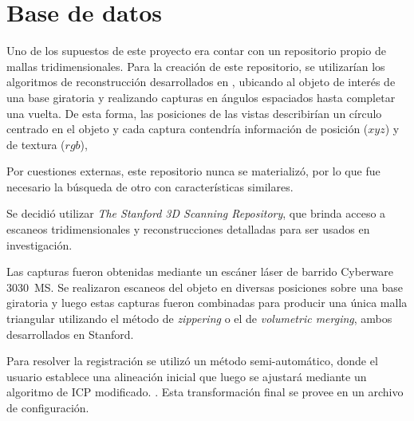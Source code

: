 \section{Base de datos}
Uno de los supuestos de este proyecto era contar con un repositorio propio de
mallas tridimensionales.
Para la creación de este repositorio,
se utilizarían los algoritmos de reconstrucción desarrollados en \cite{Pancho},
ubicando al objeto de interés de una base giratoria y realizando capturas
en ángulos espaciados hasta completar una vuelta.
De esta forma, las posiciones de las vistas describirían un círculo centrado en el objeto y
cada captura contendría información de posición ($xyz$) y de textura ($rgb$),

Por cuestiones externas, este repositorio nunca se materializó, por lo que fue necesario
la búsqueda de otro con características similares.


Se decidió utilizar \emph{The Stanford 3D Scanning Repository}, que brinda
acceso a escaneos tridimensionales y reconstrucciones detalladas para ser
usados en investigación.

Las capturas fueron obtenidas mediante un escáner láser de barrido Cyberware
3030~MS.  Se realizaron escaneos del objeto en diversas posiciones sobre una
base giratoria y luego estas capturas fueron combinadas para producir una única
malla triangular utilizando el método de \emph{zippering} o el de
\emph{volumetric merging}, ambos desarrollados en
Stanford.\cite{StanfordScanRep}

Para resolver la registración se utilizó un método semi-automático,
donde el usuario establece una alineación inicial que luego se ajustará mediante un algoritmo
de ICP modificado. \cite{Turk:1994:ZPM:192161.192241} .
Esta transformación final se provee en un archivo de configuración.

